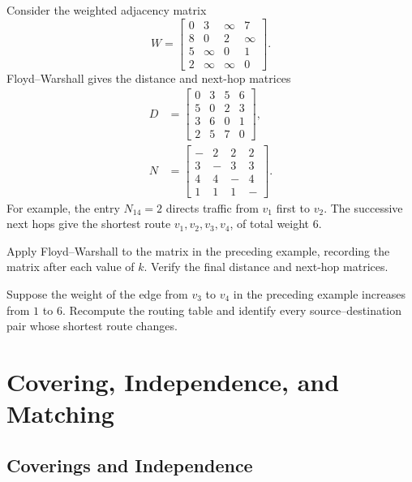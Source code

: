 \begin{Example}
Consider the weighted adjacency matrix
\begin{equation*}
W=\begin{bmatrix}
0&3&\infty&7\\
8&0&2&\infty\\
5&\infty&0&1\\
2&\infty&\infty&0
\end{bmatrix}.
\end{equation*}
Floyd--Warshall gives the distance and next-hop matrices
\begin{align*}
D&=\begin{bmatrix}
0&3&5&6\\
5&0&2&3\\
3&6&0&1\\
2&5&7&0
\end{bmatrix},\\
N&=\begin{bmatrix}
-&2&2&2\\
3&-&3&3\\
4&4&-&4\\
1&1&1&-
\end{bmatrix}.
\end{align*}
For example, the entry $N_{14}=2$ directs traffic from $v_1$ first to $v_2$. The successive next hops give the shortest route $v_1,v_2,v_3,v_4$, of total weight $6$.
\end{Example}

\begin{Exercise}
Apply Floyd--Warshall to the matrix in the preceding example, recording the matrix after each value of $k$. Verify the final distance and next-hop matrices.
\end{Exercise}

\begin{Exercise}
Suppose the weight of the edge from $v_3$ to $v_4$ in the preceding example increases from $1$ to $6$. Recompute the routing table and identify every source--destination pair whose shortest route changes.
\end{Exercise}

\section{Covering, Independence, and Matching}\label{sec:CoveringIndependence}

\subsection{Coverings and Independence}\label{subsec:CoveringsIndependence}

